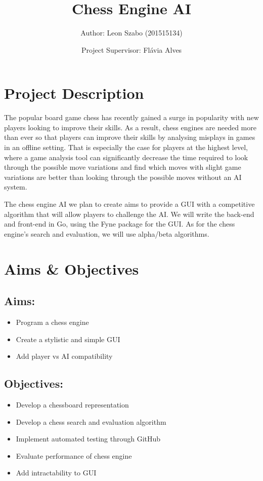 \documentclass{article}
\title{Chess Engine AI}
\author{Author: Leon Szabo (201515134)}
\date{Project Supervisor: Flávia Alves}
\begin{document}
\maketitle

\newpage
\tableofcontents

\newpage
\section{Project Description} \label{description}
The popular board game chess has recently gained a surge in popularity\cite{popularity} with new players looking to improve their skills. As a result, chess engines are needed more than ever so that players can improve their skills by analysing misplays in games in an offline setting. That is especially the case for players at the highest level, where a game analysis tool can significantly decrease the time required to look through the possible move variations and find which moves with slight game variations are better than looking through the possible moves without an AI system.

The chess engine AI we plan to create aims to provide a GUI with a competitive algorithm that will allow players to challenge the AI. We will write the back-end and front-end in Go, using the Fyne\cite{fyne} package for the GUI. As for the chess engine's search and evaluation, we will use alpha/beta algorithms.

\section{Aims \& Objectives}
\subsection{Aims:}
\begin{itemize}
    \item Program a chess engine
    \item Create a stylistic and simple GUI
    \item Add player vs AI compatibility
\end{itemize}

\subsection{Objectives:}
\begin{itemize}
    \item Develop a chessboard representation
    \item Develop a chess search and evaluation algorithm
    \item Implement automated testing through GitHub
    \item Evaluate performance of chess engine
    \item Add intractability to GUI
\end{itemize}
\end{document}
